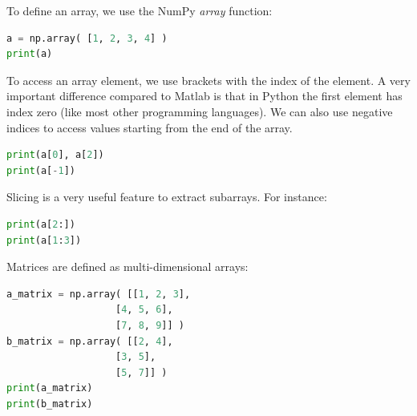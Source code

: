 \documentclass[a4paper , 12pt]{book}
\begin{document}
To define an array, we use the NumPy \textit{array} function:

\begin{center}
\begin{lstlisting}[language=Python, frame=single]
a = np.array( [1, 2, 3, 4] )
print(a)
\end{lstlisting}
\end{center}

To access an array element, we use brackets with the index of the element. A very important difference compared to Matlab is that in Python the first element has index zero (like most other programming languages). We can also use negative indices to access values starting from the end of the array.

\begin{center}
\begin{lstlisting}[language=Python, frame=single]
print(a[0], a[2])
print(a[-1])
\end{lstlisting}
\end{center}

Slicing is a very useful feature to extract subarrays. For instance:

\begin{center}
\begin{lstlisting}[language=Python, frame=single]
print(a[2:])
print(a[1:3])
\end{lstlisting}
\end{center}

Matrices are defined as multi-dimensional arrays:

\begin{center}
\begin{lstlisting}[language=Python, frame=single]
a_matrix = np.array( [[1, 2, 3], 
                   [4, 5, 6], 
                   [7, 8, 9]] )
b_matrix = np.array( [[2, 4],
                   [3, 5],
                   [5, 7]] )
print(a_matrix)
print(b_matrix)
\end{lstlisting}
\end{center}
\end{document}
